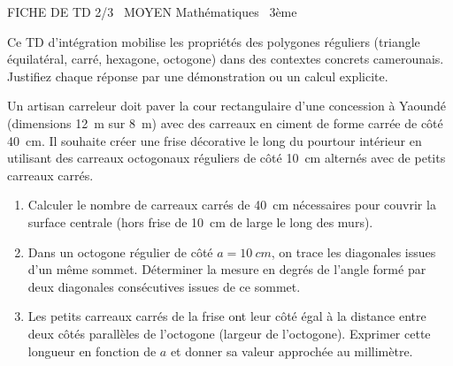 \documentclass[11pt]{article}
\begin{document}
\begin{tcolorbox}[enhanced,colback=popink,colframe=popink,arc=10pt,boxrule=0pt,left=12pt,right=12pt,top=9pt,bottom=9pt]
{\color{white}\popxbold\small FICHE DE TD 2/3 \textbullet\ MOYEN \hfill Mathématiques \textbullet\ 3ème\par}
\end{tcolorbox}
\vspace{4pt}
Ce TD d'intégration mobilise les propriétés des polygones réguliers (triangle équilatéral, carré, hexagone, octogone) dans des contextes concrets camerounais. Justifiez chaque réponse par une démonstration ou un calcul explicite.

\begin{exercice}
Un artisan carreleur doit paver la cour rectangulaire d'une concession à Yaoundé (dimensions \SI{12}{m} sur \SI{8}{m}) avec des carreaux en ciment de forme carrée de côté \SI{40}{cm}. Il souhaite créer une frise décorative le long du pourtour intérieur en utilisant des carreaux octogonaux réguliers de côté \SI{10}{cm} alternés avec de petits carreaux carrés.
\begin{enumerate}
    \item Calculer le nombre de carreaux carrés de \SI{40}{cm} nécessaires pour couvrir la surface centrale (hors frise de \SI{10}{cm} de large le long des murs).
    \item Dans un octogone régulier de côté $a = \SI{10}{cm}$, on trace les diagonales issues d'un même sommet. Déterminer la mesure en degrés de l'angle formé par deux diagonales consécutives issues de ce sommet.
    \item Les petits carreaux carrés de la frise ont leur côté égal à la distance entre deux côtés parallèles de l'octogone (largeur de l'octogone). Exprimer cette longueur en fonction de $a$ et donner sa valeur approchée au millimètre.
\end{enumerate}
\end{exercice}
\end{document}
